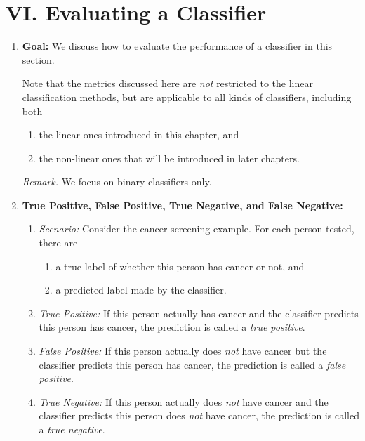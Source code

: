 \documentclass[12pt]{article}
\begin{document}
\section*{VI. Evaluating a Classifier}

\begin{enumerate}[label=\textbf{\arabic*.}]
	
	\item \textbf{Goal:} We discuss how to evaluate the performance of a classifier in this section. 
	
	Note that the metrics discussed here are \emph{not} restricted to the linear classification methods, but are applicable to all kinds of classifiers, including both 
	\begin{enumerate}
		\item the linear ones introduced in this chapter, and 
		\item the non-linear ones that will be introduced in later chapters. 
	\end{enumerate}
	
	\textit{Remark.} We focus on binary classifiers only. 
	
	\item \textbf{True Positive, False Positive, True Negative, and False Negative:} 
	\begin{enumerate}
		
		\item \textit{Scenario:} Consider the cancer screening example. For each person tested, there are 
		\begin{enumerate}
			\item a true label of whether this person has cancer or not, and 
			\item a predicted label made by the classifier. 
		\end{enumerate}
		
		\item \textit{True Positive:} If this person actually has cancer and the classifier predicts this person has cancer, the prediction is called a \emph{true positive}. 
		
		\item \textit{False Positive:} If this person actually does \emph{not} have cancer but the classifier predicts this person has cancer, the prediction is called a \emph{false positive}. 
		
		\item \textit{True Negative:} If this person actually does \emph{not} have cancer and the classifier predicts this person does \emph{not} have cancer, the prediction is called a \emph{true negative}. 
		

\end{enumerate}
\end{enumerate}
\end{document}

